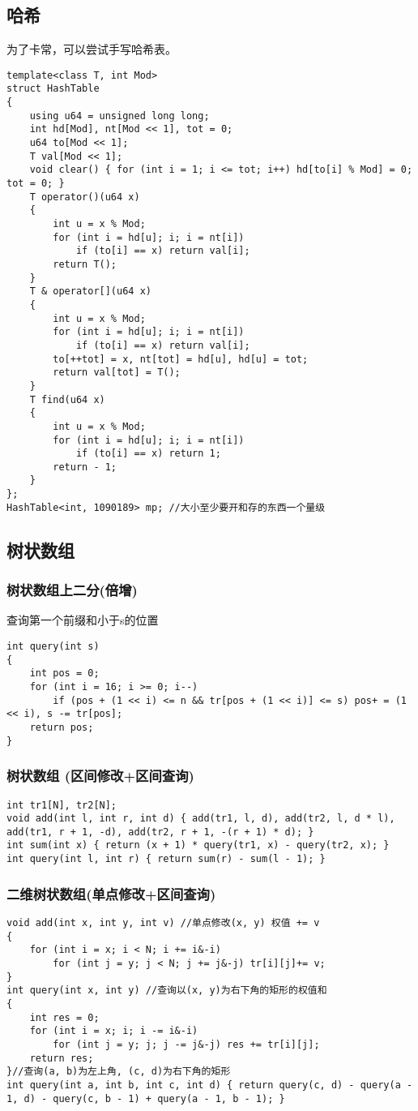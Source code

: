 \documentclass[a4paper,fontset=none]{ctexart}
\begin{document}
\subsection{哈希}
为了卡常，可以尝试手写哈希表。
\begin{verbatim}
template<class T, int Mod>
struct HashTable
{
    using u64 = unsigned long long;
    int hd[Mod], nt[Mod << 1], tot = 0;
    u64 to[Mod << 1];
    T val[Mod << 1];
    void clear() { for (int i = 1; i <= tot; i++) hd[to[i] % Mod] = 0; tot = 0; }
    T operator()(u64 x)
    {
        int u = x % Mod;
        for (int i = hd[u]; i; i = nt[i])
            if (to[i] == x) return val[i];
        return T();
    }
    T & operator[](u64 x)
    {
        int u = x % Mod;
        for (int i = hd[u]; i; i = nt[i])
            if (to[i] == x) return val[i];
        to[++tot] = x, nt[tot] = hd[u], hd[u] = tot;
        return val[tot] = T();
    }
    T find(u64 x)
    {
        int u = x % Mod;
        for (int i = hd[u]; i; i = nt[i])
            if (to[i] == x) return 1;
        return - 1;
    }
};
HashTable<int, 1090189> mp; //大小至少要开和存的东西一个量级
\end{verbatim}
\subsection{树状数组}
\subsubsection{树状数组上二分(倍增)}

查询第一个前缀和小于s的位置

\begin{verbatim}
int query(int s)
{
    int pos = 0;
    for (int i = 16; i >= 0; i--)
        if (pos + (1 << i) <= n && tr[pos + (1 << i)] <= s) pos+ = (1 << i), s -= tr[pos];
    return pos;
}
\end{verbatim}
\subsubsection{树状数组 (区间修改+区间查询)}
\begin{verbatim}
int tr1[N], tr2[N];
void add(int l, int r, int d) { add(tr1, l, d), add(tr2, l, d * l), add(tr1, r + 1, -d), add(tr2, r + 1, -(r + 1) * d); }
int sum(int x) { return (x + 1) * query(tr1, x) - query(tr2, x); }
int query(int l, int r) { return sum(r) - sum(l - 1); }
\end{verbatim}
\subsubsection{二维树状数组(单点修改+区间查询)}
\begin{verbatim}
void add(int x, int y, int v) //单点修改(x, y) 权值 += v
{
    for (int i = x; i < N; i += i&-i)
        for (int j = y; j < N; j += j&-j) tr[i][j]+= v;
}
int query(int x, int y) //查询以(x, y)为右下角的矩形的权值和
{
    int res = 0;
    for (int i = x; i; i -= i&-i)
        for (int j = y; j; j -= j&-j) res += tr[i][j];
    return res;
}//查询(a, b)为左上角, (c, d)为右下角的矩形
int query(int a, int b, int c, int d) { return query(c, d) - query(a - 1, d) - query(c, b - 1) + query(a - 1, b - 1); }
\end{verbatim}
\end{document}
